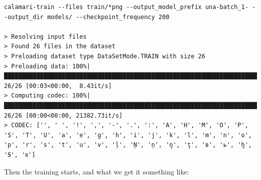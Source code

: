 \documentclass[]{book}
\begin{document}
\begin{verbatim}
calamari-train --files train/*png --output_model_prefix una-batch_1- --output_dir models/ --checkpoint_frequency 200

> Resolving input files
> Found 26 files in the dataset
> Preloading dataset type DataSetMode.TRAIN with size 26
> Preloading data: 100%|█████████████████████████████████████████████████████████████████████████████████████| 26/26 [00:03<00:00,  8.43it/s]
> Computing codec: 100%|██████████████████████████████████████████████████████████████████████████████████| 26/26 [00:00<00:00, 21382.73it/s]
> CODEC: ['', ' ', '!', ',', '-', '.', ':', 'A', 'H', 'M', 'O', 'P', 'S', 'T', 'U', 'a', 'e', 'g', 'h', 'i', 'j', 'k', 'l', 'm', 'n', 'o', 'p', 'r', 's', 't', 'u', 'v', 'ļ', 'Ņ', 'ņ', 'ŋ', 'ţ', 'в', 'ь', 'ꜧ', 'Ꞩ', 'ꞩ']
\end{verbatim}

Then the training starts, and what we get it something like:
\end{document}
